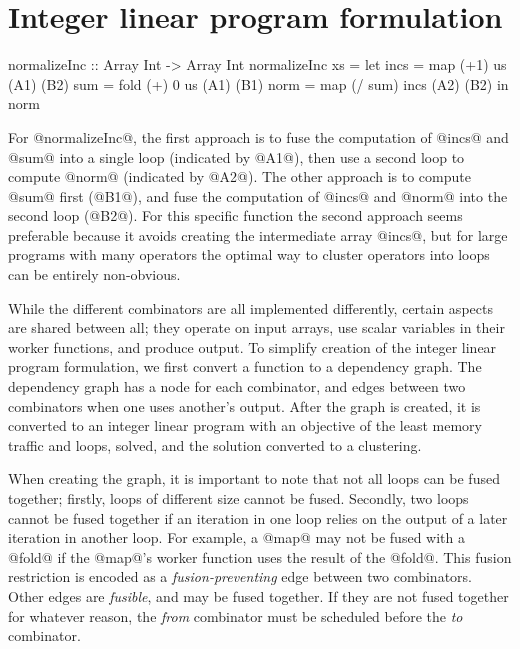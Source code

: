 \section{Integer linear program formulation}

\begin{code}
 normalizeInc :: Array Int -> Array Int
 normalizeInc xs
  = let incs = map  (+1)    us      (A1) (B2)
        sum  = fold (+) 0   us      (A1) (B1)
        norm = map  (/ sum) incs    (A2) (B2)
    in  norm
\end{code}

For @normalizeInc@, the first approach is to fuse the computation of @incs@ and @sum@ into a single loop (indicated by @A1@), then use a second loop to compute @norm@ (indicated by @A2@). The other approach is to compute @sum@ first (@B1@), and fuse the computation of @incs@ and @norm@ into the second loop (@B2@). For this specific function the second approach seems preferable because it avoids creating the intermediate array @incs@, but for large programs with many operators the optimal way to cluster operators into loops can be entirely non-obvious. 


While the different combinators are all implemented differently, certain aspects are shared between all; they operate on input arrays, use scalar variables in their worker functions, and produce output.
To simplify creation of the integer linear program formulation, we first convert a function to a dependency graph.
The dependency graph has a node for each combinator, and edges between two combinators when one uses another's output.
After the graph is created, it is converted to an integer linear program with an objective of the least memory traffic and loops, solved, and the solution converted to a clustering.



When creating the graph, it is important to note that not all loops can be fused together; firstly, loops of different size cannot be fused.
Secondly, two loops cannot be fused together if an iteration in one loop relies on the output of a later iteration in another loop.
For example, a @map@ may not be fused with a @fold@ if the @map@'s worker function uses the result of the @fold@.
This fusion restriction is encoded as a \emph{fusion-preventing} edge between two combinators.
Other edges are \emph{fusible}, and may be fused together.
If they are not fused together for whatever reason, the \emph{from} combinator must be scheduled before the \emph{to} combinator.



